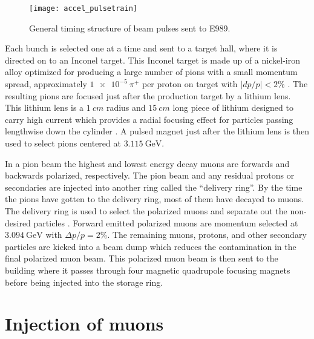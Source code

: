 \begin{figure}[]
    \centering
    \texttt{[image: accel\_pulsetrain]}
    \caption[Fermilab accelerator pulse train]{General timing structure of beam pulses sent to E989.}   
    \label{fig:pulsetrain}
\end{figure}


Each bunch is selected one at a time and sent to a target hall, where it is directed on to an Inconel target. This Inconel target is made up of a nickel-iron alloy optimized for producing a large number of pions with a small momentum spread, approximately $\SI{1e-5}{\pi^{+}}$ per proton on target with $|dp/p| < 2 \%$ \cite{Stratakis:2017uci}. The resulting pions are focused just after the production target by a lithium lens. This lithium lens is a $\SI{1}{cm}$ radius and $\SI{15}{cm}$ long piece of lithium designed to carry high current which provides a radial focusing effect for particles passing lengthwise down the cylinder \cite{LiLens}. A pulsed magnet just after the lithium lens is then used to select pions centered at $\SI{3.115}{\GeV}$.

In a pion beam the highest and lowest energy decay muons are forwards and backwards polarized, respectively. The pion beam and any residual protons or secondaries are injected into another ring called the ``delivery ring''. By the time the pions have gotten to the delivery ring, most of them have decayed to muons. The delivery ring is used to select the polarized muons and separate out the non-desired particles \cite{Stratakis:2017uci}. Forward emitted polarized muons are momentum selected at $\SI{3.094}{\GeV}$ with $\Delta p / p = 2\%$. The remaining muons, protons, and other secondary particles are kicked into a beam dump which reduces the contamination in the final polarized muon beam. This polarized muon beam is then sent to the \gmtwo building where it passes through four magnetic quadrupole focusing magnets before being injected into the storage ring.




\section{Injection of muons}
\label{sec:injection}


